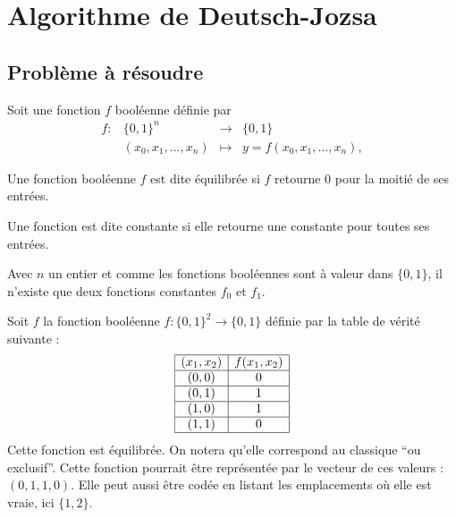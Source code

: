 \chapter{Algorithme de Deutsch-Jozsa}

\section{Problème à résoudre}
Soit une fonction $f$ booléenne définie par 
\[
  \begin{array}{llll}
    f :  &  \{0, 1\}^n              & \to       & \{ 0, 1 \} \\
         &  (x_0, x_1, \dots , x_n) & \mapsto   &  y = f(x_0, x_1, \dots , x_n), 
  \end{array}  
\]

\begin{definition}
  Une fonction booléenne $f$ est dite équilibrée si $f$ retourne 0
  pour la moitié de ses entrées.
\end{definition}

\begin{definition}
  Une fonction est dite constante si elle retourne une constante pour
  toutes ses entrées.
\end{definition}


\begin{rem}
  Avec $n$ un entier et comme les fonctions booléennes sont à valeur
  dans $\{0,1\}$, il n'existe que deux fonctions constantes $f_0$ et
  $f_1$.
\end{rem}

\begin{ex}
  Soit $f$ la fonction booléenne $f : \{0,1\}^2 \to \{0,1\}$ définie
  par la table de vérité suivante :
\[
  \begin{array}{|c|c|}
    \hline
   (x_1, x_2) & f(x_1,x_2) \\
    \hline
    (0,0) & 0 \\
    \hline
    (0,1) & 1 \\
    \hline
    (1,0) & 1 \\
    \hline
    (1,1) & 0 \\
    \hline
  \end{array}
\]
Cette fonction est équilibrée. On notera qu'elle correspond au
classique ``ou exclusif''. Cette fonction pourrait être représentée
par le vecteur de ces valeurs : $(0,1,1,0)$. Elle peut aussi être
codée en listant les emplacements où elle est vraie, ici $\{1,2\}$.
\end{ex}

